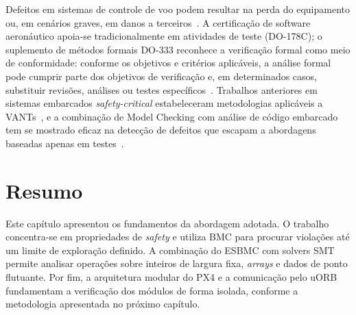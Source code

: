 Defeitos em sistemas de controle de voo podem resultar na perda do equipamento
ou, em cenários graves, em danos a terceiros~\cite{Siddiqi2022, Mekdad2023}. A
certificação de software aeronáutico apoia-se tradicionalmente em atividades de
teste (DO-178C); o suplemento de métodos formais DO-333 reconhece a verificação
formal como meio de conformidade: conforme os objetivos e critérios aplicáveis, a
análise formal pode cumprir parte dos objetivos de verificação e, em determinados
casos, substituir revisões, análises ou testes específicos~\cite{RTCA_DO178C,
RTCA_DO333}. Trabalhos
anteriores em sistemas embarcados \textit{safety-critical} estabeleceram
metodologias aplicáveis a VANTs~\cite{Mzid2024}, e a combinação de Model Checking
com análise de código embarcado tem se mostrado eficaz na detecção de defeitos que
escapam a abordagens baseadas apenas em testes~\cite{Khairullah2022, Sousa2026}.

\section{Resumo}

Este capítulo apresentou os fundamentos da abordagem adotada. O trabalho concentra-se em propriedades de \textit{safety} e utiliza BMC para procurar violações até um limite de exploração definido. A combinação do ESBMC com solvers SMT permite analisar operações sobre inteiros de largura fixa, \textit{arrays} e dados de ponto flutuante. Por fim, a arquitetura modular do PX4 e a comunicação pelo uORB fundamentam a verificação dos módulos de forma isolada, conforme a metodologia apresentada no próximo capítulo.
